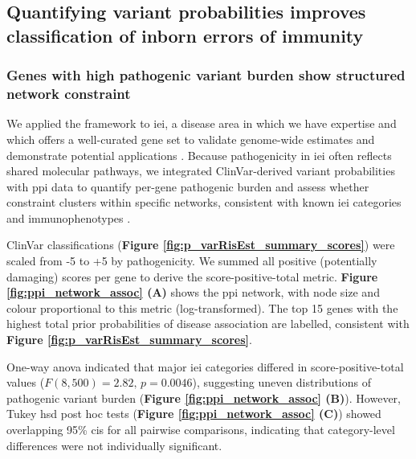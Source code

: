 \subsection{Quantifying variant probabilities improves classification of inborn errors of immunity}

\subsubsection*{Genes with high pathogenic variant burden show structured network constraint}

We applied the framework to \ac{iei}, a disease area in which we have expertise and which offers a well-curated gene set to validate genome-wide estimates and demonstrate potential applications \cite{poli_human_2025}. Because pathogenicity in \ac{iei} often reflects shared molecular pathways, we integrated ClinVar-derived variant probabilities with \ac{ppi} data to quantify per-gene pathogenic burden and assess whether constraint clusters within specific networks, consistent with known \ac{iei} categories and immunophenotypes \cite{szklarczyk2025string, karczewski2020mutational}.


ClinVar classifications (\textbf{Figure \ref{fig:p_varRisEst_summary_scores}}) were scaled from -5 to +5 by pathogenicity. 
We summed all positive (potentially damaging) scores per gene to derive the score-positive-total metric. 
\textbf{Figure \ref{fig:ppi_network_assoc} (A)} shows the \ac{ppi} network, with node size and colour proportional to this metric (log-transformed). 
The top 15 genes with the highest total prior probabilities of disease association are labelled, consistent with \textbf{Figure \ref{fig:p_varRisEst_summary_scores}}.



One-way \ac{anova} indicated that major \ac{iei} categories differed in score-positive-total values (\(F(8,500)=2.82,\,p=0.0046\)), suggesting uneven distributions of pathogenic variant burden (\textbf{Figure \ref{fig:ppi_network_assoc} (B)}). 
However, Tukey \ac{hsd} post hoc tests (\textbf{Figure \ref{fig:ppi_network_assoc} (C)}) showed overlapping 95\% \ac{ci}s for all pairwise comparisons, indicating that category-level differences were not individually significant.



